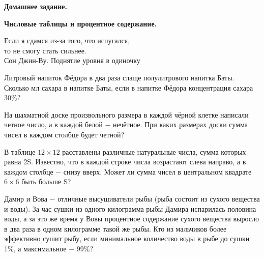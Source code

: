 \hspace{3mm}

\centerline{\bf \Huge Домашнее задание.}
\centerline{\bf \Huge Числовые таблицы и процентное содержание.}

\begin{flushright}
    \scriptsize{Если я сдамся из-за того, что испугался,\\
                то не смогу стать сильнее.
                \\Сон Джин-Ву. Поднятие уровня в одиночку}
\end{flushright}


 Литровый напиток Фёдора в два раза слаще полулитрового напитка Баты. Сколько мл сахара в напитке Баты, если в напитке Фёдора концентрация сахара 30\%?

 На шахматной доске произвольного размера в каждой чёрной клетке написали четное число, а в каждой белой $-$ нечётное. При каких размерах доски сумма чисел в каждом столбце будет четной?

 В таблице $12\times12$ расставлены различные натуральные числа, сумма которых равна 2S. Известно, что в каждой строке числа возрастают слева направо, а в каждом столбце $-$ снизу вверх. Может ли сумма чисел в центральном квадрате $6\times6$ быть больше S?

 Дамир и Вова $-$ отличные высушиватели рыбы (рыба состоит из сухого вещества и воды). За час сушки из одного килограмма рыбы Дамира испарилась половина воды, а за это же время у Вовы процентное содержание сухого вещества выросло в два раза в одном килограмме такой же рыбы. Кто из мальчиков более эффективно сушит рыбу, если минимальное количество воды в рыбе до сушки 1\%, а максимальное $-$ 99\%?